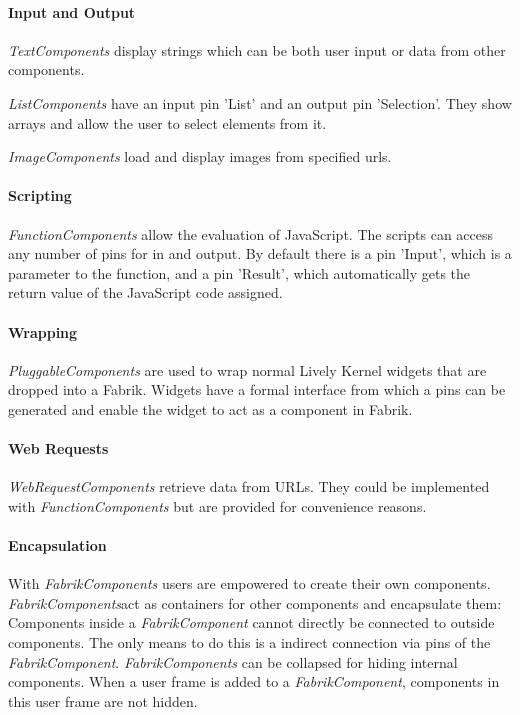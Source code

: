 \documentclass[pdftex, times, 10pt, twocolumn]{article}
\begin{document}
\paragraph{Input and Output}
{\em TextComponents} display strings which can be both user input or data from other components. 

{\em ListComponents} have an input pin 'List' and an output pin 'Selection'. They show arrays and allow the user to select elements from it. 

{\em ImageComponents} load and display images from specified urls. 



\paragraph{Scripting}
{\em FunctionComponents} allow the evaluation of JavaScript. The scripts can access any  number of pins for in and output. By default there is a pin 'Input', which is a parameter to the function, and a pin 'Result', which automatically gets the return value of the JavaScript code assigned. 



\paragraph{Wrapping}
{\em PluggableComponents} are used to wrap normal Lively Kernel widgets that are dropped into a Fabrik. Widgets have a formal interface from which a pins can be generated and enable the widget to act as a component in Fabrik.  



\paragraph{Web Requests}
{\em WebRequestComponents} retrieve data from URLs. They could be implemented with {\em FunctionComponents} but are provided for convenience reasons.   



\paragraph{Encapsulation}
With {\em FabrikComponents} users are empowered to create their own components. {\em FabrikComponents}act as containers for other components and encapsulate them: Components inside a {\em FabrikComponent} cannot directly be connected to outside components. The only means to do this is a indirect connection via pins of the {\em FabrikComponent}. {\em FabrikComponents} can be collapsed for hiding internal components. When a user frame is added to a {\em FabrikComponent}, components in this user frame are not hidden.  
\end{document}
